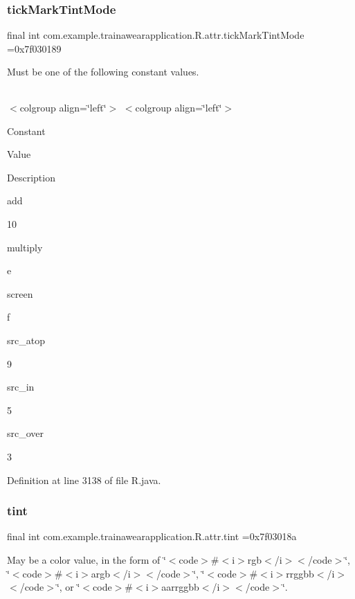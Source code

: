 \subsubsection{\texorpdfstring{tickMarkTintMode}{tickMarkTintMode}}
{\footnotesize\ttfamily final int com.\+example.\+trainawearapplication.\+R.\+attr.\+tick\+Mark\+Tint\+Mode =0x7f030189\hspace{0.3cm}{\ttfamily [static]}}

Must be one of the following constant values.

\tabulinesep=1mm
\begin{longtabu}spread 0pt [c]{*{0}{|X[-1]}|}
\hline
\end{longtabu}
$<$colgroup align=\char`\"{}left\char`\"{}$>$ $<$colgroup align=\char`\"{}left\char`\"{}$>$ 

Constant

Value

Description 

add

10

multiply

e

screen

f

src\+\_\+atop

9

src\+\_\+in

5

src\+\_\+over

3

Definition at line 3138 of file R.\+java.

\mbox{\label{classcom_1_1example_1_1trainawearapplication_1_1_r_1_1attr_a8191a7e1f1ac4a0a44c4ae643ff15521}} 
\subsubsection{\texorpdfstring{tint}{tint}}
{\footnotesize\ttfamily final int com.\+example.\+trainawearapplication.\+R.\+attr.\+tint =0x7f03018a\hspace{0.3cm}{\ttfamily [static]}}

May be a color value, in the form of \char`\"{}$<$code$>$\#$<$i$>$rgb$<$/i$>$$<$/code$>$\char`\"{}, \char`\"{}$<$code$>$\#$<$i$>$argb$<$/i$>$$<$/code$>$\char`\"{}, \char`\"{}$<$code$>$\#$<$i$>$rrggbb$<$/i$>$$<$/code$>$\char`\"{}, or \char`\"{}$<$code$>$\#$<$i$>$aarrggbb$<$/i$>$$<$/code$>$\char`\"{}. 

